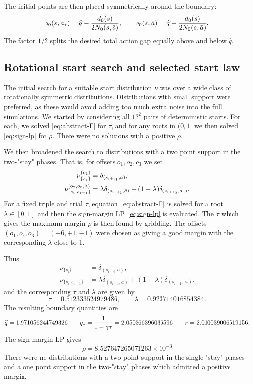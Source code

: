The initial points are then placed symmetrically around the boundary:
\begin{equation*}
    q_0(s,a_*)=\widehat q-{d_0(s)\over 2N_0(s,\bar a)},
    \qquad
    q_0(s,\bar a)=\widehat q+{d_0(s)\over 2N_0(s,\bar a)}.
  \end{equation*}
The factor $1/2$ splits the desired total action gap equally above and below $\widehat q$.



\subsection{Rotational start search and selected start law}
\label{sec:start-search}
The initial search for a suitable start distribution $\nu$ was over a
wide class of rotationally symmetric distributions. Distributions with
small support were preferred, as these would avoid adding too much
extra noise into the full simulations. We started by
considering all $13^2$ pairs of deterministic starts. For each, we solved
\eqref{eq:abstract-F} for $\tau$, and for any roots in $(0,1]$ we
then solved  \eqref{eq:sign-lp} for $\rho$. There were no solutions
with a positive $\rho$.

We then broadened the search to distributions with a two point support
in the two-"stay" phases. That is, 
for offsets $o_1,o_2,o_3$ we set
\begin{align}
    \nu_{\{s_i\}}^{(o_1)}
    &=\delta_{(s_{i+o_1},\bar a)},\\
    \nu_{\{s_i,s_{i-1}\}}^{(o_2,o_3,\lambda)}
    &=\lambda\delta_{(s_{i+o_2},\bar a)}+(1-
    \lambda)\delta_{(s_{i+o_3},a_*)}.
\end{align}
For a fixed triple and trial $\tau$, equation~\eqref{eq:abstract-F} is
solved for a root $\lambda\in[0,1]$ and then the sign-margin
LP~\eqref{eq:sign-lp} is evaluated. The $\tau$ which gives the maximum margin $\rho$ is then
found by gridding. The offsets
$    (o_1,o_2,o_3)=(-6,+1,-1)$ were chosen as giving a good margin
with the corresponding $\lambda$ close to 1.

Thus
\begin{align}
\nu_{\{s_i\}}&=\delta_{(s_{i-6},\bar a)},\\
\nu_{\{s_i,s_{i-1}\}}&=\lambda\delta_{(s_{i+1},\bar a)}+(1-
\lambda)\delta_{(s_{i-1},a_*)}.
\end{align}
and the corresponding $\tau$ and $\lambda$ are given by
\begin{equation*}
    \tau=0.512333524979486,
    \qquad
    \lambda=0.923714016854384.
\end{equation*}
The resulting boundary quantities are
\begin{equation*}
    \widehat q=1.971056244749326
    \qquad
    q_*={1\over 1-
    \gamma\tau}=2.050366396036596
    \qquad
    r=2.010039006519156.
\end{equation*}
The sign-margin LP gives
\begin{equation*}
    \rho=8.527647265071263\times10^{-3}
  \end{equation*}
There were no  distributions with a two point support
in the single-"stay" phases and a one point support in the two-"stay" phases which admitted a positive margin.

